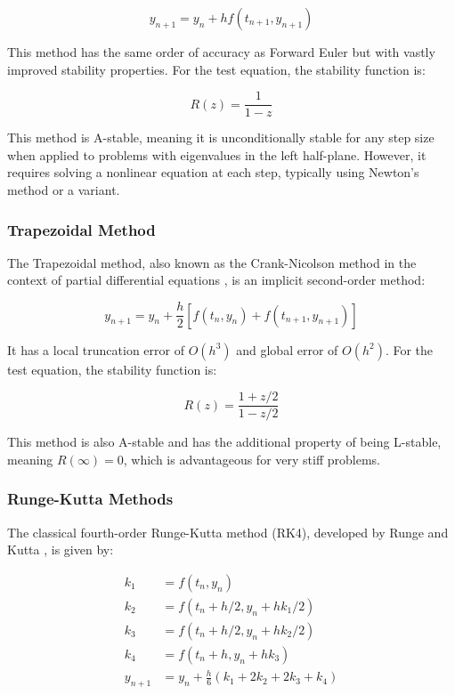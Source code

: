 \documentclass[11pt,a4paper]{article}
\begin{document}
\begin{equation}
y_{n+1} = y_n + h f(t_{n+1}, y_{n+1})
\end{equation}

This method has the same order of accuracy as Forward Euler but with vastly improved stability properties. For the test equation, the stability function is:

\begin{equation}
R(z) = \frac{1}{1-z}
\end{equation}

This method is A-stable, meaning it is unconditionally stable for any step size when applied to problems with eigenvalues in the left half-plane. However, it requires solving a nonlinear equation at each step, typically using Newton's method or a variant.

\subsubsection{Trapezoidal Method}

The Trapezoidal method, also known as the Crank-Nicolson method in the context of partial differential equations \cite{crank1947practical}, is an implicit second-order method:

\begin{equation}
y_{n+1} = y_n + \frac{h}{2} [f(t_n, y_n) + f(t_{n+1}, y_{n+1})]
\end{equation}

It has a local truncation error of $O(h^3)$ and global error of $O(h^2)$. For the test equation, the stability function is:

\begin{equation}
R(z) = \frac{1 + z/2}{1 - z/2}
\end{equation}

This method is also A-stable and has the additional property of being L-stable, meaning $R(\infty) = 0$, which is advantageous for very stiff problems.

\subsubsection{Runge-Kutta Methods}

The classical fourth-order Runge-Kutta method (RK4), developed by Runge \cite{runge1895numerische} and Kutta \cite{kutta1901beitrag}, is given by:

\begin{align}
k_1 &= f(t_n, y_n) \\
k_2 &= f(t_n + h/2, y_n + h k_1/2) \\
k_3 &= f(t_n + h/2, y_n + h k_2/2) \\
k_4 &= f(t_n + h, y_n + h k_3) \\
y_{n+1} &= y_n + \frac{h}{6}(k_1 + 2k_2 + 2k_3 + k_4)
\end{align}
\end{document}
